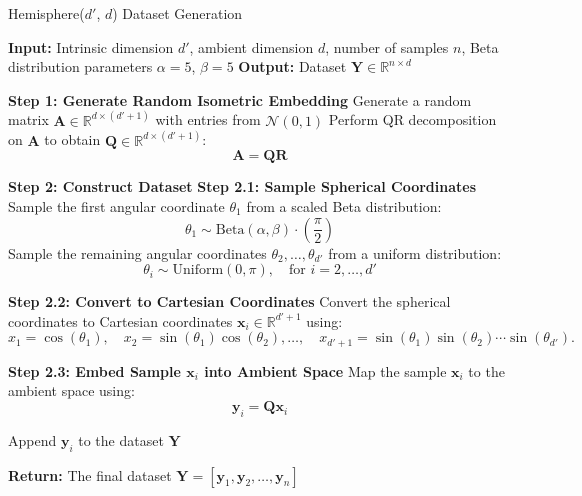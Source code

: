 \begin{algorithm}
    \caption{Hemisphere($d'$, $d$) Dataset Generation}
    \begin{algorithmic}[1]
        \STATE \textbf{Input:} Intrinsic dimension $d'$, ambient dimension $d$, number of samples $n$, Beta distribution parameters $\alpha = 5$, $\beta = 5$
        \STATE \textbf{Output:} Dataset $\mathbf{Y} \in \mathbb{R}^{n \times d}$

        \STATE \textbf{Step 1: Generate Random Isometric Embedding}
        \STATE Generate a random matrix $\mathbf{A} \in \mathbb{R}^{d \times (d'+1)}$ with entries from $\mathcal{N}(0, 1)$
        \STATE Perform QR decomposition on $\mathbf{A}$ to obtain $\mathbf{Q} \in \mathbb{R}^{d \times (d'+1)}$:
        \[
        \mathbf{A} = \mathbf{Q} \mathbf{R}
        \]

        \STATE \textbf{Step 2: Construct Dataset}
            \STATE \textbf{Step 2.1: Sample Spherical Coordinates}
            \STATE Sample the first angular coordinate $\theta_1$ from a scaled Beta distribution:
            \[
            \theta_1 \sim \text{Beta}(\alpha, \beta) \cdot \left( \frac{\pi}{2} \right)
            \]
            \STATE Sample the remaining angular coordinates $\theta_2, \dots, \theta_{d'}$ from a uniform distribution:
            \[
            \theta_i \sim \text{Uniform}(0, \pi), \quad \text{for } i = 2, \dots, d'
            \]

            \STATE \textbf{Step 2.2: Convert to Cartesian Coordinates}
            \STATE Convert the spherical coordinates to Cartesian coordinates $\mathbf{x}_i \in \mathbb{R}^{d'+1}$ using:
            \[
            x_1 = \cos(\theta_1), \quad x_2 = \sin(\theta_1) \cos(\theta_2), \dots, \quad x_{d'+1} = \sin(\theta_1) \sin(\theta_2) \cdots \sin(\theta_{d'}).
            \]

            \STATE \textbf{Step 2.3: Embed Sample $\mathbf{x}_i$ into Ambient Space}
            \STATE Map the sample $\mathbf{x}_i$ to the ambient space using:
            \[
            \mathbf{y}_i = \mathbf{Q} \mathbf{x}_i
            \]

            \STATE Append $\mathbf{y}_i$ to the dataset $\mathbf{Y}$
        \ENDFOR
        
        \STATE \textbf{Return:} The final dataset $\mathbf{Y} = [\mathbf{y}_1, \mathbf{y}_2, \dots, \mathbf{y}_n]$
    \end{algorithmic}
\end{algorithm}

